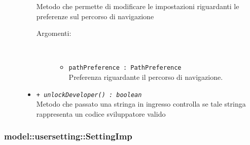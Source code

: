 \documentclass[../DefinizioneDiProdotto.tex]{subfiles}
\begin{document}
\begin{description}
\begin{itemize}
Metodo che permette di modificare le impostazioni riguardanti le preferenze sul percorso di navigazione
 \begin{description}
\item[Argomenti:] \
\begin{itemize}
\item \texttt{pathPreference : PathPreference}\\
Preferenza riguardante il percorso di navigazione.\end{itemize}
\end{description}
\item \texttt{+ \textit{unlockDeveloper() : boolean}}\\
Metodo che passato una stringa in ingresso controlla se tale stringa rappresenta un codice sviluppatore valido
 \end{itemize}
\end{description}

\subsubsection{model::usersetting::SettingImp}
\end{document}
